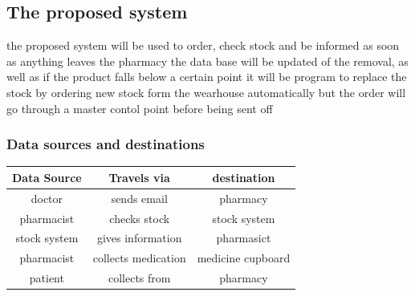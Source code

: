 \subsection{The proposed system}
the proposed system will be used to order, check stock and be informed as soon as anything leaves the pharmacy the data base will be updated of the removal, as well as if the product falls below a certain point it will be program to replace the stock by ordering new stock form the wearhouse automatically but the order will go through a master contol point before being sent off 
\subsubsection{Data sources and destinations}
\begin{table}[h]
\begin{tabular}{|c|c|c|}
\hline
Data Source & Travels via & destination\\
\hline
doctor & sends email & pharmacy\\
\hline
pharmacist & checks stock & stock system\\
\hline 
stock system & gives information & pharmasict\\
\hline
pharmacist & collects medication & medicine cupboard\\
\hline
patient & collects from & pharmacy\\
\hline
\end{tabular}
\end{table}
\pagebreak
